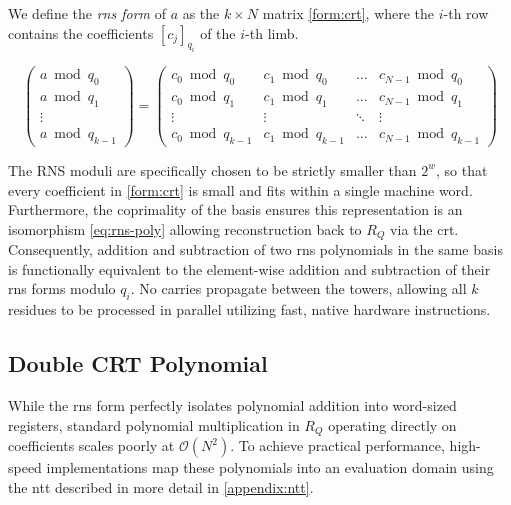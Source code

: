 \newcommand{\firstForm}{\gls{rns} form}
\begin{definition}
    We define the \emph{\firstForm} of $a$ as the $k \times N$ matrix \eqref{form:crt}, where the $i$-th row contains the coefficients $[c_j]_{q_i}$ of the $i$-th limb.

    \begin{equation}
        \label{form:crt}
        \begin{pmatrix}
            a \bmod q_0 \\
            a \bmod q_1 \\
            \vdots \\
            a \bmod q_{k-1}
        \end{pmatrix}
        =
        \begin{pmatrix}
            c_0 \bmod{q_0} & c_1 \bmod{q_0} & \dots & c_{N-1}\bmod{q_0} \\
            c_0 \bmod{q_1} & c_1 \bmod{q_1} & \dots & c_{N-1}\bmod{q_1} \\
            \vdots & \vdots & \ddots & \vdots \\
            c_0 \bmod{q_{k-1}} & c_1 \bmod{q_{k-1}} & \dots & c_{N-1}\bmod{q_{k-1}}
        \end{pmatrix}
    \end{equation}
\end{definition}

The RNS moduli are specifically chosen to be strictly smaller than $2^w$, so that every coefficient in \eqref{form:crt} is small and fits within a single machine word. Furthermore, the coprimality of the basis ensures this representation is an isomorphism \eqref{eq:rns-poly} allowing reconstruction back to $R_Q$ via the \gls{crt}. Consequently, addition and subtraction of two \gls{rns} polynomials in the same basis is functionally equivalent to the element-wise addition and subtraction of their \firstForm{s} modulo $q_i$. No carries propagate between the towers, allowing all $k$ residues to be processed in parallel utilizing fast, native hardware instructions.

\subsection{Double CRT Polynomial}
While the \firstForm{} perfectly isolates polynomial addition into word-sized registers, standard polynomial multiplication in $R_Q$ operating directly on coefficients scales poorly at $\mathcal{O}(N^2)$. To achieve practical performance, high-speed implementations map these polynomials into an evaluation domain using the \gls{ntt} described in more detail in \autoref{appendix:ntt}.

